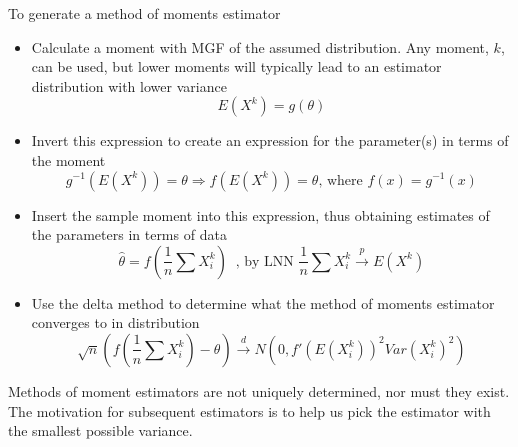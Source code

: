\documentclass{article}
\begin{document}
To generate a method of moments estimator
\begin{itemize}
    \item Calculate a moment with MGF of the assumed distribution. Any moment, $k$, can be used, but lower moments will typically lead to an estimator distribution with lower variance
    \begin{equation*}
        E(X^k) = g(\theta)
    \end{equation*}
    \item Invert this expression to create an expression for the parameter(s) in terms of the moment
    \begin{equation*}
        g^{-1}(E(X^k)) = \theta \Longrightarrow f(E(X^k)) = \theta \textrm{, where } f(x) = g^{-1}(x)
    \end{equation*}
    \item Insert the sample moment into this expression, thus obtaining estimates of the parameters in terms of data
    \begin{equation*}
        \hat{\theta} = f(\frac{1}{n}\sum X_i^k) \; \;\textrm{, by LNN } \frac{1}{n}\sum X_i^k \overset{p}{\longrightarrow} E(X^k)
    \end{equation*}
    \item Use the delta method to determine what the method of moments estimator converges to in distribution
    \begin{equation*}
        \sqrt{n}(f(\frac{1}{n}\sum X_i^k) - \theta) \overset{d}{\longrightarrow}  N(0, f'(E(X_i^k))^2Var(X_i^k)^2)
    \end{equation*}
\end{itemize}
Methods of moment estimators are not uniquely determined, nor must they exist. The motivation for subsequent estimators is to help us pick the estimator with the smallest possible variance.
\end{document}
